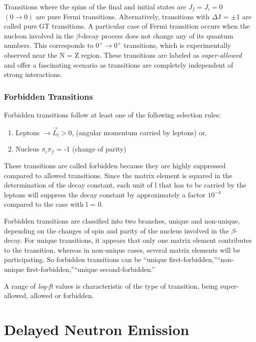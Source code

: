 \documentclass[a4paper,12pt,twoside]{report}
\begin{document}
Transitions where the spins of the final and initial states are $J_{f} = J_{i} = 0$  $(0 \to 0)$ are pure Fermi transitions. Alternatively, transitions with $\Delta$J = $\pm$1 are called pure GT transitions. A particular case of Fermi transition occurs when the nucleon involved in the $\beta$-decay process does not change any of its quantum numbers. This corresponds to $0^{+} \to  0^{+}$ transitions, which is experimentally observed near the N = Z region. These transitions are labeled as \textit{super-allowed} and offer a fascinating scenario as transitions are completely independent of strong interactions. 

\subsubsection{Forbidden Transitions}
Forbidden transitions follow at least one of the following selection rules:
\begin{enumerate}
    \item Leptons $\to \vec{L}_{l} > 0$, (angular momentum carried by leptons) or,
\item Nucleus $\pi_{i}\pi_{f}$ = -1 (change of parity)
\end{enumerate}

These transitions are called forbidden because they are highly suppressed compared to allowed transitions. Since the matrix element is squared in the determination of the decay constant, each unit of l that has to be carried by the leptons will suppress the decay constant by approximately a factor $10^{-4}$ compared to the case with l = 0.

Forbidden transitions are classified into two branches, unique and non-unique, depending on the changes of spin and parity of the nucleus involved in the $\beta$-decay. For unique transitions, it appears that only one matrix element contributes to the transition, whereas in non-unique cases, several matrix elements will be participating. So forbidden transitions can be \textquotedblleft unique first-forbidden,\textquotedblright \textquotedblleft non-unique first-forbidden,\textquotedblright \textquotedblleft unique second-forbidden.\textquotedblright

A range of \textit{log-ft} values is characteristic of the type of transition, being super-allowed, allowed or forbidden.


\section{Delayed Neutron Emission}
\end{document}
